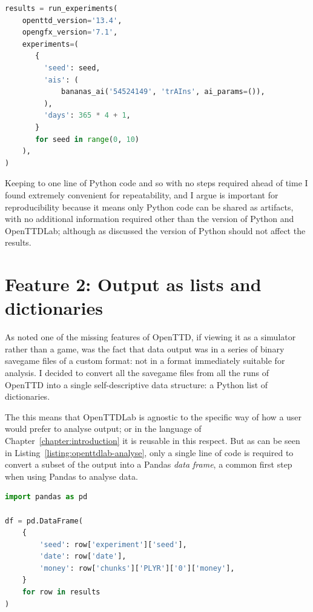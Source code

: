\documentclass[logo,msc,dsti]{style/infthesis}    %
\begin{document}
{\begin{lstlisting}[label=listing:openttdlab,language=Python, caption={Example usage of OpenTTDLab that runs the trAIns AI for a single year of in-game time for random seeds 0 to 9.}]
results = run_experiments(
    openttd_version='13.4',
    opengfx_version='7.1',
    experiments=(
       {
         'seed': seed,
         'ais': (
             bananas_ai('54524149', 'trAIns', ai_params=()),
         ),
         'days': 365 * 4 + 1,
       }
       for seed in range(0, 10)
    ),
)
\end{lstlisting}
%
Keeping to one line of Python code and so with no steps required ahead of time I found extremely convenient for repeatability, and I argue is important for reproducibility because it means only Python code can be shared as artifacts, with no additional information required other than the version of Python and OpenTTDLab; although as discussed the version of Python should not affect the results.

\section{Feature 2: Output as lists and dictionaries}

As noted one of the missing features of OpenTTD, if viewing it as a simulator rather than a game, was the fact that data output was in a series of binary savegame files of a custom format: not in a format immediately suitable for analysis. I decided to convert all the savegame files from all the runs of OpenTTD into a single self-descriptive data structure: a Python list of dictionaries. 

The this means that OpenTTDLab is agnostic to the specific way of how a user would prefer to analyse output; or in the language of Chapter~\ref{chapter:introduction} it is reusable in this respect. But as can be seen in Listing~\ref{listing:openttdlab-analyse}, only a single line of code is required to convert a subset of the output into a Pandas \emph{data frame}, a common first step when using Pandas to analyse data.

\begin{lstlisting}[label=listing:openttdlab-analyse,language=Python, caption={Example usage of the results of OpenTTDLab, such as those generated in \ref{listing:openttdlab}, converting them to a Pandas DataFrame.}]
import pandas as pd

df = pd.DataFrame(
    {
        'seed': row['experiment']['seed'],
        'date': row['date'],
        'money': row['chunks']['PLYR']['0']['money'],
    }
    for row in results
)
\end{lstlisting}

}
\end{document}
